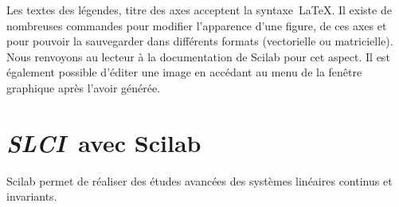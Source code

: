 Les textes des légendes, titre des axes acceptent la syntaxe~\LaTeX.
Il existe de nombreuses commandes pour modifier l'apparence
d'une figure, de ces axes et pour pouvoir la sauvegarder
dans différents formats (vectorielle ou matricielle).
Nous renvoyons au lecteur à la documentation de Scilab pour
cet aspect. Il est également possible d'éditer une image en accédant
au menu de la fenêtre graphique après l'avoir générée.
\section{\emph{{\scshape SLCI}}~avec Scilab}
Scilab permet de réaliser des études avancées des systèmes linéaires continus 
et invariants.
